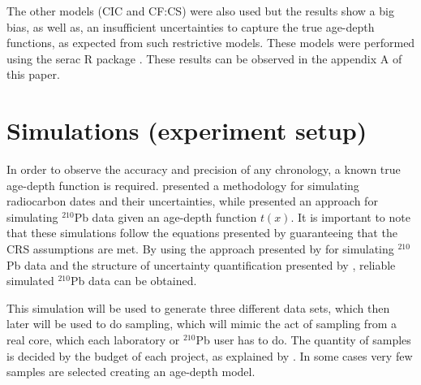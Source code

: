 \documentclass [10pt] {article}
\begin{document}

The other models (CIC and CF:CS) were also used but the results show a big bias, as well as, an insufficient uncertainties to capture the true age-depth functions, as expected from such restrictive models.
These models were performed using the serac R package \citep{Bruel_2020}. 
These results can be observed in the appendix A of this paper.





\section{Simulations (experiment setup)}

	In order to observe the accuracy and precision of any chronology, a known true age-depth function is required.
\citet{Blaauw2018} presented a methodology for simulating radiocarbon dates and their uncertainties, while \citet{Aquino2018} presented an approach for simulating $^{210}$Pb data given an age-depth function $t(x)$.
It is important to note that these simulations follow the equations presented by \cite{Appleby1978, Robbins1978} guaranteeing that the CRS assumptions are met. 
By using the approach presented by \citet{Aquino2018} for simulating $^{210}$Pb data and the structure of uncertainty quantification presented by \citet{Blaauw2018}, reliable simulated $^{210}$Pb data can be obtained.

	This simulation will be used to generate three different data sets, which then later will be used to do sampling, which will mimic the act of sampling from a real core, which each laboratory or $^{210}$Pb user has to do. 
The quantity of samples is decided by the budget of each project, as explained by \citet{Blaauw2018}. 
In some cases very few samples are selected creating an age-depth model.
\end{document}
